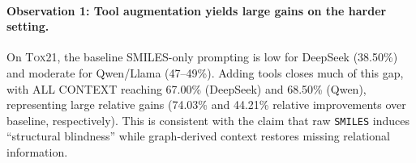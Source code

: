 \documentclass[
]{ceurart}
\newcommand{\dataset}[1]{\textsc{#1}}
\newcommand{\smiles}{\texttt{SMILES}}
\begin{document}

\paragraph{Observation 1: Tool augmentation yields large gains on the harder setting.}
On \dataset{Tox21}, the baseline SMILES-only prompting is low for DeepSeek (38.50\%) and moderate for Qwen/Llama (47--49\%).
Adding tools closes much of this gap, with ALL CONTEXT reaching 67.00\% (DeepSeek) and 68.50\% (Qwen), representing large relative gains
(74.03\% and 44.21\% relative improvements over baseline, respectively).
This is consistent with the claim that raw \smiles{} induces ``structural blindness'' while graph-derived context restores missing relational information.
\end{document}
